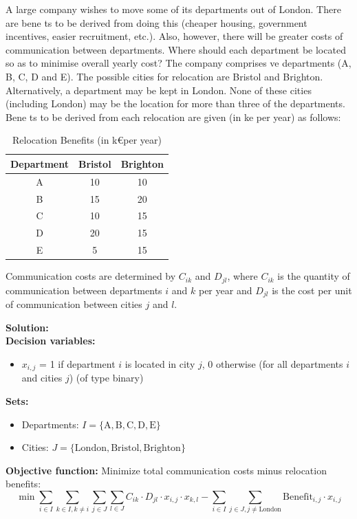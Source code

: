 \documentclass[a4paper,10pt]{article}
\begin{document}
A large company wishes to move some of its departments out of London. There are bene ts to be
derived from doing this (cheaper housing, government incentives, easier recruitment, etc.). Also,
however, there will be greater costs of communication between departments. Where should each
department be located so as to minimise overall yearly cost?
The company comprises ve departments (A, B, C, D and E). The possible cities for relocation
are Bristol and Brighton. Alternatively, a department may be kept in London. None of these
cities (including London) may be the location for more than three of the departments. Bene ts
to be derived from each relocation are given (in ke per year) as follows:

\begin{table}[H]
\centering
\begin{tabular}{|c|c|c|}
\hline
Department & Bristol & Brighton \\
\hline
A & 10 & 10 \\
B & 15 & 20 \\
C & 10 & 15 \\
D & 20 & 15 \\
E & 5 & 15 \\
\hline
\end{tabular}
\caption{Relocation Benefits (in k\euro per year)}
\end{table}

Communication costs are determined by $C_{ik}$ and $D_{jl}$, where $C_{ik}$ is the quantity of communication
between departments $i$ and $k$ per year and $D_{jl}$ is the cost per unit of communication between
cities $j$ and $l$.

\textbf{Solution:}\\
\textbf{Decision variables:}
\begin{itemize}
  \item \(x_{i,j}\) = 1 if department \(i\) is located in city \(j\), 0 otherwise (for all departments \(i\) and cities \(j\)) (of type binary)
  
\end{itemize}

\textbf{Sets:}
\begin{itemize}
  \item Departments: \(I = \{\text{A}, \text{B}, \text{C}, \text{D}, \text{E}\}\)
  \item Cities: \(J = \{\text{London}, \text{Bristol}, \text{Brighton}\}\)
\end{itemize}

\textbf{Objective function:}
Minimize total communication costs minus relocation benefits:
\[
  \min \sum_{i \in I} \sum_{k \in I, k \neq i} \sum_{j \in J} \sum_{l \in J} C_{ik} \cdot D_{jl} \cdot x_{i,j} \cdot x_{k,l} - \sum_{i \in I} \sum_{j \in J, j \neq \text{London}} \text{Benefit}_{i,j} \cdot x_{i,j}
\]
\end{document}
